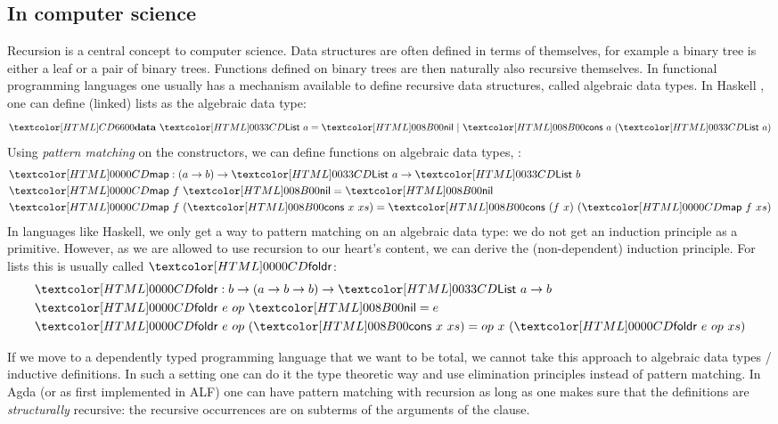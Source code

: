 \subsection{In computer science}

Recursion is a central concept to computer science. Data structures
are often defined in terms of themselves, for example a binary tree is
either a leaf or a pair of binary trees. Functions defined on binary
trees are then naturally also recursive themselves. In functional
programming languages one usually has a mechanism available to define
recursive data structures, called algebraic data types. In Haskell \cite{Jones2003},
one can define (linked) lists as the algebraic data type:
$$
\data\ \List\ a = \listnil\ |\ \listcons\ a\ (\List\ a)
$$
Using \emph{pattern matching} on the constructors, we can define
functions on algebraic data types, \eg:
\begin{align*}
  &\listmap : (a \to b) \to \List\ a \to \List\ b \\
  &\listmap\ f\ \listnil = \listnil \\
  &\listmap\ f\ (\listcons\ x\ xs) = \listcons\ (f\ x)\ (\listmap\ f\ xs)
\end{align*}
In languages like Haskell, we only get a way to pattern matching on an
algebraic data type: we do not get an induction principle as a
primitive. However, as we are allowed to use recursion to our heart's
content, we can derive the (non-dependent) induction principle. For
lists this is usually called $\listfoldr$:
\begin{align*}
  &\listfoldr : b \to (a \to b \to b) \to \List\ a \to b \\
  &\listfoldr\ e\ op\ \listnil = e \\
  &\listfoldr\ e\ op\ (\listcons\ x\ xs) = op\ x\ (\listfoldr\ e\ op\ xs)
\end{align*}

If we move to a dependently typed programming language that we want to
be total, we cannot take this approach to algebraic data types /
inductive definitions. In such a setting one can do it the type
theoretic way and use elimination principles instead of pattern
matching.  In Agda (or as first implemented in ALF) one can have
pattern matching with recursion as long as one makes sure that the
definitions are \emph{structurally} recursive: the recursive
occurrences are on subterms of the arguments of the clause.

